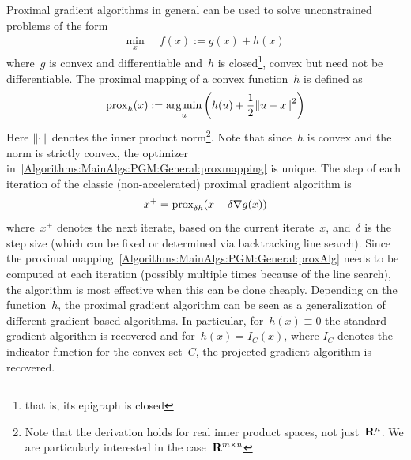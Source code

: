 \documentclass{../../common/projectreport}
\begin{document}
Proximal gradient algorithms in general can be used to solve unconstrained problems of the form 
%
\begin{align}
\min_{x} \;\; &f(x) := g(x) + h(x)
\label{Algorithms:MainAlgs:PGM:General:GenPGA}
\end{align}
%
where~$g$ is convex and differentiable and~$h$ is closed\footnote{that is, its epigraph is closed}, convex but need not be differentiable. The proximal mapping of a convex function~$h$ is defined as
%
\begin{align}
{\operatorname{prox}_{h}(x)} := \operatorname*{arg\,min}_u \left( h(u) + \frac{1}{2}{\left\|u-x\right\|}_{}^{2} \right)
\label{Algorithms:MainAlgs:PGM:General:proxmapping}
\end{align}
%
Here ${\left\|\cdot\right\|}_{}^{}$ denotes the inner product norm\footnote{Note that the derivation holds for real inner product spaces, not just~${\mathbf R}^n$. We are particularly interested in the case~${\mathbf R}^{m\times n}$}. Note that since~$h$ is convex and the norm is strictly convex, the optimizer in~\eqref{Algorithms:MainAlgs:PGM:General:proxmapping} is unique. The step of each iteration of the classic (non-accelerated) proximal gradient algorithm is
%
\begin{align}
x^+ = {\operatorname{prox}_{\delta h}(x-\delta \nabla g(x))}
\label{Algorithms:MainAlgs:PGM:General:proxAlg}
\end{align}
%
where~$x^+$ denotes the next iterate, based on the current iterate~$x$, and~$\delta$ is the step size (which can be fixed or determined via backtracking line search). Since the proximal mapping~\eqref{Algorithms:MainAlgs:PGM:General:proxAlg} needs to be computed at each iteration (possibly multiple times because of the line search), the algorithm is most effective when this can be done cheaply. Depending on the function~$h$, the proximal gradient algorithm can be seen as a generalization of different gradient-based algorithms. In particular, for~$h(x) \equiv 0$ the standard gradient algorithm is recovered and for~$h(x) = I_C(x)$, where $I_C$ denotes the indicator function for the convex set~$C$, the projected gradient algorithm is recovered. 
\end{document}
